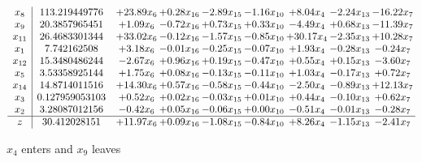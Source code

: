 \documentclass[9pt]{article}
\begin{document}
 \[\begin{array}{c| c c@{\hskip 2pt} c@{\hskip 2pt} c@{\hskip 2pt} c@{\hskip 2pt} c@{\hskip 2pt} c@{\hskip 2pt} c@{\hskip 2pt} }
 x_{8}   &  113.219449776 & + 23.89 x_{6} & +  0.28 x_{16} & -2.89 x_{15} & -1.16 x_{10} & +  8.04 x_{4} & -2.24 x_{13} & -16.22 x_{7}\\
 x_{9}   &  20.3857965451 & +  1.09 x_{6} & -0.72 x_{16} & +  0.73 x_{15} & +  0.33 x_{10} & -4.49 x_{4} & +  0.68 x_{13} & -11.39 x_{7}\\
 x_{11}   &  26.4683301344 & + 33.02 x_{6} & -0.12 x_{16} & -1.57 x_{15} & -0.85 x_{10} & + 30.17 x_{4} & -2.35 x_{13} & + 10.28 x_{7}\\
 x_{1}   &  7.742162508 & +  3.18 x_{6} & -0.01 x_{16} & -0.25 x_{15} & -0.07 x_{10} & +  1.93 x_{4} & -0.28 x_{13} & -0.24 x_{7}\\
 x_{12}   &  15.3480486244 & -2.67 x_{6} & +  0.96 x_{16} & +  0.19 x_{15} & -0.47 x_{10} & +  0.55 x_{4} & +  0.15 x_{13} & -3.60 x_{7}\\
 x_{5}   &  3.53358925144 & +  1.75 x_{6} & +  0.08 x_{16} & -0.13 x_{15} & -0.11 x_{10} & +  1.03 x_{4} & -0.17 x_{13} & +  0.72 x_{7}\\
 x_{14}   &  14.8714011516 & + 14.30 x_{6} & +  0.57 x_{16} & -0.58 x_{15} & -0.44 x_{10} & -2.50 x_{4} & -0.89 x_{13} & + 12.13 x_{7}\\
 x_{3}   &  0.127959053103 & +  0.52 x_{6} & +  0.02 x_{16} & -0.03 x_{15} & +  0.01 x_{10} & +  0.44 x_{4} & -0.10 x_{13} & +  0.62 x_{7}\\
 x_{2}   &  3.28087012156 & -0.42 x_{6} & +  0.05 x_{16} & -0.06 x_{15} & +  0.00 x_{10} & -0.51 x_{4} & -0.01 x_{13} & -0.28 x_{7}\\
\hline
z    &  30.412028151 & + 11.97 x_{6} & +  0.09 x_{16} & -1.08 x_{15} & -0.84 x_{10} & +  8.26 x_{4} & -1.15 x_{13} & -2.41 x_{7}\\
\end{array}\]


 $ x_{4} $ enters and $ x_{9} $ leaves 
\end{document}
